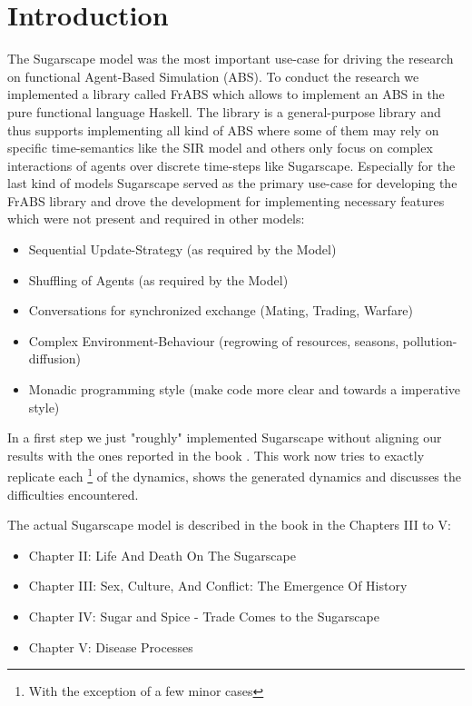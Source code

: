 \section{Introduction}
The Sugarscape model was the most important use-case for driving the research on functional Agent-Based Simulation (ABS). To conduct the research we implemented a library called FrABS which allows to implement an ABS in the pure functional language Haskell. The library is a general-purpose library and thus supports implementing all kind of ABS where some of them may rely on specific time-semantics like the SIR model and others only focus on complex interactions of agents over discrete time-steps like Sugarscape.
Especially for the last kind of models Sugarscape served as the primary use-case for developing the FrABS library and drove the development for implementing necessary features which were not present and required in other models:

\begin{itemize}
	\item Sequential Update-Strategy (as required by the Model)
	\item Shuffling of Agents (as required by the Model)
	\item Conversations for synchronized exchange (Mating, Trading, Warfare)
	\item Complex Environment-Behaviour (regrowing of resources, seasons, pollution-diffusion)
	\item Monadic programming style (make code more clear and towards a imperative style)
\end{itemize}

In a first step we just "roughly" implemented Sugarscape without aligning our results with the ones reported in the book \cite{epstein_growing_1996}. This work now tries to exactly replicate each \footnote{With the exception of a few minor cases} of the dynamics, shows the generated dynamics and discusses the difficulties encountered.

The actual Sugarscape model is described in the book \cite{epstein_growing_1996} in the Chapters III to V:

\begin{itemize}
	\item Chapter II: Life And Death On The Sugarscape
	\item Chapter III: Sex, Culture, And Conflict: The Emergence Of History
	\item Chapter IV: Sugar and Spice - Trade Comes to the Sugarscape
	\item Chapter V: Disease Processes
\end{itemize}


